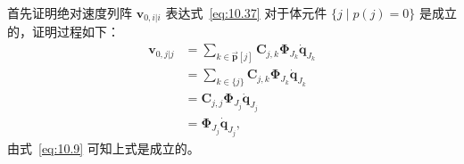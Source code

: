 首先证明绝对速度列阵 $\boldsymbol{v}_{0,i|i}$ 表达式~\eqref{eq:10.37} 对于体元件 $\{ j \mid p(j) = 0 \}$ 是成立的，证明过程如下：
\begin{equation}\label{eq:11.55}
\begin{aligned}
\boldsymbol{v}_{0,j|j} &= \sum_{k \in \vec{\boldsymbol{p}}[j]} \boldsymbol{C}_{j,k} \boldsymbol{\Phi}_{J_k} \dot{\boldsymbol{q}}_{J_k} \\
&= \sum_{k \in \{j\}} \boldsymbol{C}_{j,k} \boldsymbol{\Phi}_{J_k} \dot{\boldsymbol{q}}_{J_k} \\
&= \boldsymbol{C}_{j,j} \boldsymbol{\Phi}_{J_j} \dot{\boldsymbol{q}}_{J_j} \\
&= \boldsymbol{\Phi}_{J_j} \dot{\boldsymbol{q}}_{J_j},
\end{aligned}
\end{equation}
由式~\eqref{eq:10.9} 可知上式是成立的。

